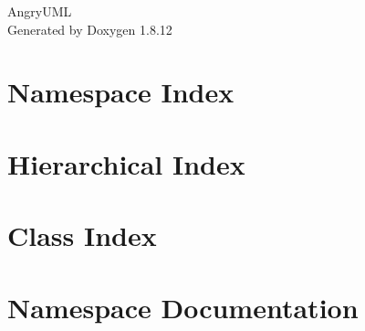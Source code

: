 \documentclass[twoside]{book}
\newcommand{\+}{\discretionary{\mbox{\scriptsize$\hookleftarrow$}}{}{}}
\newcommand{\clearemptydoublepage}{%
  \newpage{\pagestyle{empty}\cleardoublepage}%
}
\begin{document}
\hypersetup{pageanchor=false,
             bookmarksnumbered=true,
             pdfencoding=unicode
            }
\begin{titlepage}
\vspace*{7cm}
\begin{center}%
{\Large Angry\+U\+ML }\\
\vspace*{1cm}
{\large Generated by Doxygen 1.8.12}\\
\end{center}
\end{titlepage}
\clearemptydoublepage
{}
\tableofcontents
\clearemptydoublepage
{}
\hypersetup{pageanchor=true}

\chapter{Namespace Index}

\chapter{Hierarchical Index}

\chapter{Class Index}

\chapter{Namespace Documentation}

\end{document}
